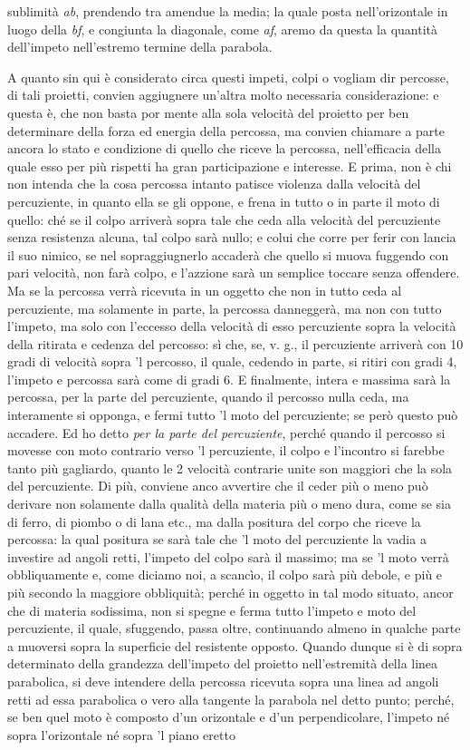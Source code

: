 \documentclass[11pt,twoside,openany]{book}
\begin{document}
sublimità \emph{ab}, prendendo tra amendue la media; la quale posta nell'orizontale in luogo della \emph{bf}, e congiunta la diagonale, come \emph{af}, aremo da questa la quantità dell'impeto nell'estremo termine della parabola.

A quanto sin qui è considerato circa questi impeti, colpi o vogliam dir percosse, di tali proietti, convien aggiugnere un'altra molto necessaria considerazione: e questa è, che non basta por mente alla sola velocità del proietto per ben determinare della forza ed energia della percossa, ma convien chiamare a parte ancora lo stato e condizione di quello che riceve la percossa, nell'efficacia della quale esso per più rispetti ha gran participazione e interesse. E prima, non è chi non intenda che la cosa percossa intanto patisce violenza dalla velocità del percuziente, in quanto ella se gli oppone, e frena in tutto o in parte il moto di quello: ché se il colpo arriverà sopra tale che ceda alla velocità del percuziente senza resistenza alcuna, tal colpo sarà nullo; e colui che corre per ferir con lancia il suo nimico, se nel sopraggiugnerlo accaderà che quello si muova fuggendo con pari velocità, non farà colpo, e l'azzione sarà un semplice toccare senza offendere. Ma se la percossa verrà ricevuta in un oggetto che non in tutto ceda al percuziente, ma solamente in parte, la percossa danneggerà, ma non con tutto l'impeto, ma solo con l'eccesso della velocità di esso percuziente sopra la velocità della ritirata e cedenza del percosso: sì che, se, v. g., il percuziente arriverà con 10 gradi di velocità sopra 'l percosso, il quale, cedendo in parte, si ritiri con gradi 4, l'impeto e percossa sarà come di gradi 6. E finalmente, intera e massima sarà la percossa, per la parte del percuziente, quando il percosso nulla ceda, ma interamente si opponga, e fermi tutto 'l moto del percuziente; se però questo può accadere. Ed ho detto \emph{per la parte del percuziente}, perché quando il percosso si movesse con moto contrario verso 'l percuziente, il colpo e l'incontro si farebbe tanto più gagliardo, quanto le 2 velocità contrarie unite son maggiori che la sola del percuziente. Di più, conviene anco avvertire che il ceder più o meno può derivare non solamente dalla qualità della materia più o meno dura, come se sia di ferro, di piombo o di lana etc., ma dalla positura del corpo che riceve la percossa: la qual positura se sarà tale che 'l moto del percuziente la vadia a investire ad angoli retti, l'impeto del colpo sarà il massimo; ma se 'l moto verrà obbliquamente e, come diciamo noi, a scancìo, il colpo sarà più debole, e più e più secondo la maggiore obbliquità; perché in oggetto in tal modo situato, ancor che di materia sodissima, non si spegne e ferma tutto l'impeto e moto del percuziente, il quale, sfuggendo, passa oltre, continuando almeno in qualche parte a muoversi sopra la superficie del resistente opposto. Quando dunque si è di sopra determinato della grandezza dell'impeto del proietto nell'estremità della linea parabolica, si deve intendere della percossa ricevuta sopra una linea ad angoli retti ad essa parabolica o vero alla tangente la parabola nel detto punto; perché, se ben quel moto è composto d'un orizontale e d'un perpendicolare, l'impeto né sopra l'orizontale né sopra 'l piano eretto 
\end{document}
